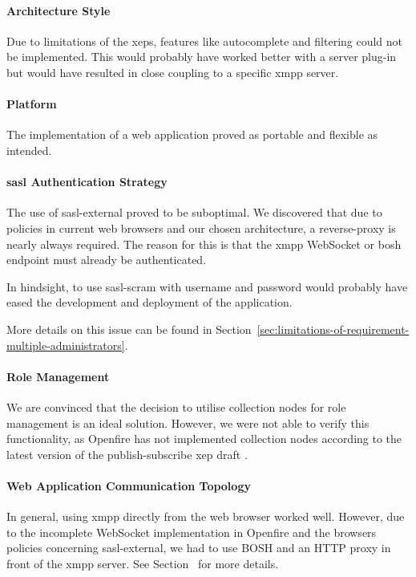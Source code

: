 \paragraph{Architecture Style}
Due to limitations of the \glspl{xep}, features like autocomplete and filtering could not be implemented.
This would probably have worked better with a server plug-in but would have resulted in close coupling to a specific \gls{xmpp} server.

\paragraph{Platform}
The implementation of a web application proved as portable and flexible as intended.

\paragraph{\gls{sasl} Authentication Strategy}
The use of \gls{sasl-external} proved to be suboptimal.
We discovered that due to policies in current web browsers and our chosen architecture, a reverse-proxy is nearly always required. The reason for this is that the \gls{xmpp} WebSocket or \gls{bosh} endpoint must already be authenticated.

In hindsight, to use \gls{sasl-scram} with username and password would probably have eased the development and deployment of the application.

More details on this issue can be found in Section~\ref{sec:limitations-of-requirement-multiple-administrators}.

\paragraph{Role Management}
We are convinced that the decision to utilise collection nodes for role management is an ideal solution.
However, we were not able to verify this functionality, as Openfire has not implemented collection nodes according to the latest version of the \gls{publish-subscribe} \gls{xep} draft \cite{xep-0248}.

\paragraph{Web Application Communication Topology}
In general, using \gls{xmpp} directly from the web browser worked well.
However, due to the incomplete WebSocket implementation in Openfire and the browsers policies concerning \gls{sasl-external}, we had to use BOSH and an HTTP proxy in front of the \gls{xmpp} server.
See Section~ for more details.

